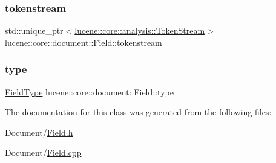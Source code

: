 \subsubsection{\texorpdfstring{tokenstream}{tokenstream}}
{\footnotesize\ttfamily std\+::unique\+\_\+ptr$<$\mbox{\hyperlink{classlucene_1_1core_1_1analysis_1_1TokenStream}{lucene\+::core\+::analysis\+::\+Token\+Stream}}$>$ lucene\+::core\+::document\+::\+Field\+::tokenstream\hspace{0.3cm}{\ttfamily [protected]}}

\mbox{\label{classlucene_1_1core_1_1document_1_1Field_a7d5849d933ebde73422710069643ccff}} 
\subsubsection{\texorpdfstring{type}{type}}
{\footnotesize\ttfamily \mbox{\hyperlink{classlucene_1_1core_1_1document_1_1FieldType}{Field\+Type}} lucene\+::core\+::document\+::\+Field\+::type\hspace{0.3cm}{\ttfamily [protected]}}



The documentation for this class was generated from the following files\+:\begin{DoxyCompactItemize}
\item 
Document/\mbox{\hyperlink{Document_2Field_8h}{Field.\+h}}\item 
Document/\mbox{\hyperlink{Field_8cpp}{Field.\+cpp}}\end{DoxyCompactItemize}
